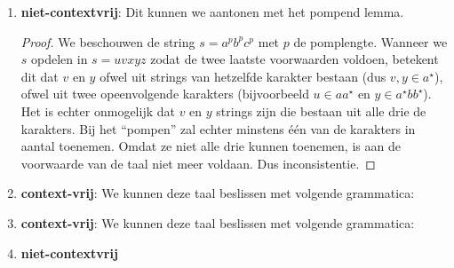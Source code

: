 \documentclass[a4paper]{article}
\begin{document}
\begin{question}
\begin{answer}
\begin{enumerate}
\begin{proof}
\end{proof}
\item \textbf{niet-contextvrij}: Dit kunnen we aantonen met het pompend lemma.
\begin{proof}
We beschouwen de string $s=a^pb^pc^p$ met $p$ de pomplengte. Wanneer we $s$ opdelen in $s=uvxyz$ zodat de twee laatste voorwaarden voldoen, betekent dit dat $v$ en $y$ ofwel uit strings van hetzelfde karakter bestaan (dus $v,y\in a^{\star}$), ofwel uit twee opeenvolgende karakters (bijvoorbeeld $u\in aa^{\star}$ en $y\in a^{\star}bb^{\star}$). Het is echter onmogelijk dat $v$ en $y$ strings zijn die bestaan uit alle drie de karakters. Bij het ``pompen'' zal echter minstens \'e\'en van de karakters in aantal toenemen. Omdat ze niet alle drie kunnen toenemen, is aan de voorwaarde van de taal niet meer voldaan. Dus inconsistentie.
\end{proof}
\item \textbf{context-vrij}: We kunnen deze taal beslissen met volgende grammatica:
\item \textbf{context-vrij}: We kunnen deze taal beslissen met volgende grammatica:
\item \textbf{niet-contextvrij}
\end{enumerate}
\end{answer}
\end{question}
\end{document}
